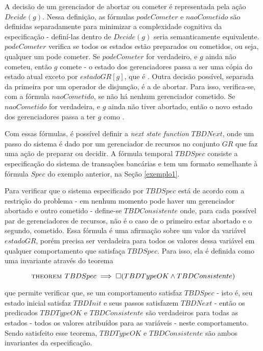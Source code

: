 A decisão de um gerenciador de abortar ou cometer é representada pela ação $Decide(g)$. Nessa definição, as fórmulas $podeCometer$ e $naoCometido$ são definidas separadamente para minimizar a complexidade cognitiva da especificação - definí-las dentro de $Decide(g)$ seria semanticamente equivalente. $podeCometer$ verifica se todos os estados estão preparados ou cometidos, ou seja, qualquer um pode cometer. Se $podeCometer$ for verdadeiro, e $g$ ainda não cometeu, então $g$ comete - o estado dos gerenciadores passa a ser uma cópia do estado atual exceto por $estadoGR[g]$, que é \cometido. Outra decisão possível, separada da primeira por um operador de disjunção, é a de abortar. Para isso, verifica-se, com a fórmula $naoCometido$, se não há nenhum gerenciador cometido. Se $naoCometido$ for verdadeira, e $g$ ainda não tiver abortado, então o novo estado dos gerenciadores passa a ter $g$ como \abortado.

Com essas fórmulas, é possível definir a \textit{next state function} $TBDNext$, onde um passo do sistema é dado por um gerenciador de recursos no conjunto $GR$ que faz uma ação de preparar ou decidir. A fórmula temporal $TBDSpec$ consiste a especificação do sistema de transações bancárias e tem um formato semelhante à fórmula $Spec$ do exemplo anterior, na Seção \ref{exemplo1}.

Para verificar que o sistema especificado por $TBDSpec$ está de acordo com a restrição do problema - em nenhum momento pode haver um gerenciador abortado e outro cometido - define-se $TBDConsistente$ onde, para cada possível par de gerenciadores de recursos, não é o caso de o primeiro estar abortado e o segundo, cometido. Essa fórmula é uma afirmação sobre um valor da variável $estadoGR$, porém precisa ser verdadeira para todos os valores dessa variável em qualquer comportamento que satisfaça $TBDSpec$. Para isso, ela é definida como uma invariante através do teorema

\[\textsc{theorem } TBDSpec \implies \square(TBDTypeOK \land TBDConsistente)\]

que permite verificar que, se um comportamento satisfaz $TBDSpec$ - isto é, seu estado inicial satisfaz $TBDInit$ e seus passos satisfazem $TBDNext$ - então os predicados $TBDTypeOK$ e $TBDConsistente$ são verdadeiros para todas as estados - todos os valores atribuídos para as variáveis - neste comportamento. Sendo satisfeito esse teorema, $TBDTypeOK$ e $TBDConsistente$ são ambos invariantes da especificação.


